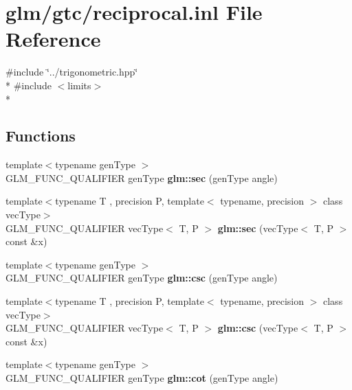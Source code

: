 \hypertarget{reciprocal_8inl}{\section{glm/gtc/reciprocal.inl File Reference}
\label{reciprocal_8inl}
}
{\ttfamily \#include \char`\"{}../trigonometric.\-hpp\char`\"{}}\\*
{\ttfamily \#include $<$limits$>$}\\*
\subsection*{Functions}
\begin{DoxyCompactItemize}
\item 
\hypertarget{namespaceglm_a50ae4a1b04d5ff626db13d6bb92a2c9e}{{\footnotesize template$<$typename gen\-Type $>$ }\\G\-L\-M\-\_\-\-F\-U\-N\-C\-\_\-\-Q\-U\-A\-L\-I\-F\-I\-E\-R gen\-Type {\bfseries glm\-::sec} (gen\-Type angle)}\label{namespaceglm_a50ae4a1b04d5ff626db13d6bb92a2c9e}

\item 
\hypertarget{namespaceglm_ab94ec38d09e409a1d0b402961a186d5d}{{\footnotesize template$<$typename T , precision P, template$<$ typename, precision $>$ class vec\-Type$>$ }\\G\-L\-M\-\_\-\-F\-U\-N\-C\-\_\-\-Q\-U\-A\-L\-I\-F\-I\-E\-R vec\-Type$<$ T, P $>$ {\bfseries glm\-::sec} (vec\-Type$<$ T, P $>$ const \&x)}\label{namespaceglm_ab94ec38d09e409a1d0b402961a186d5d}

\item 
\hypertarget{namespaceglm_a5342fb605ca415a20df6895720b1cdae}{{\footnotesize template$<$typename gen\-Type $>$ }\\G\-L\-M\-\_\-\-F\-U\-N\-C\-\_\-\-Q\-U\-A\-L\-I\-F\-I\-E\-R gen\-Type {\bfseries glm\-::csc} (gen\-Type angle)}\label{namespaceglm_a5342fb605ca415a20df6895720b1cdae}

\item 
\hypertarget{namespaceglm_a3bdd2d38714ee045d866807ae9574882}{{\footnotesize template$<$typename T , precision P, template$<$ typename, precision $>$ class vec\-Type$>$ }\\G\-L\-M\-\_\-\-F\-U\-N\-C\-\_\-\-Q\-U\-A\-L\-I\-F\-I\-E\-R vec\-Type$<$ T, P $>$ {\bfseries glm\-::csc} (vec\-Type$<$ T, P $>$ const \&x)}\label{namespaceglm_a3bdd2d38714ee045d866807ae9574882}

\item 
\hypertarget{namespaceglm_affb4cc5b308512bac40c88faa7204349}{{\footnotesize template$<$typename gen\-Type $>$ }\\G\-L\-M\-\_\-\-F\-U\-N\-C\-\_\-\-Q\-U\-A\-L\-I\-F\-I\-E\-R gen\-Type {\bfseries glm\-::cot} (gen\-Type angle)}\label{namespaceglm_affb4cc5b308512bac40c88faa7204349}


\end{DoxyCompactItemize}
